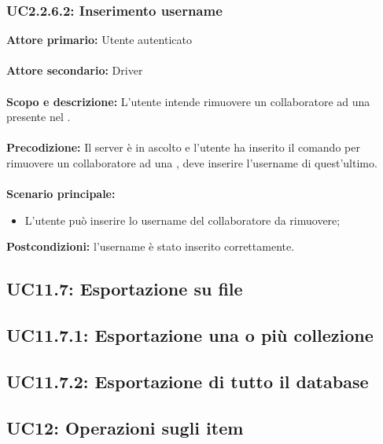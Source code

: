 \documentclass{scalatekids-article}
\begin{document}
\subsubsection{UC2.2.6.2: Inserimento username}

\textbf{Attore primario:} Utente autenticato\\ \\
\textbf{Attore secondario:} Driver\\ \\
\textbf{Scopo e descrizione:} L’utente intende rimuovere un collaboratore ad una  presente nel .\\ \\
\textbf{Precodizione:} Il server è in ascolto e l’utente ha inserito il comando per rimuovere un collaboratore ad una , deve inserire l'username di quest'ultimo.\\ \\
\textbf{Scenario principale:}
\begin{itemize}
\item L'utente può inserire lo username del collaboratore da rimuovere;
\end{itemize}
\textbf{Postcondizioni:} l'username è stato inserito correttamente.

\subsection{UC11.7: Esportazione su file}

\subsection{UC11.7.1: Esportazione una o più collezione}

\subsection{UC11.7.2: Esportazione di tutto il database}

\subsection{UC12: Operazioni sugli item}
\end{document}
